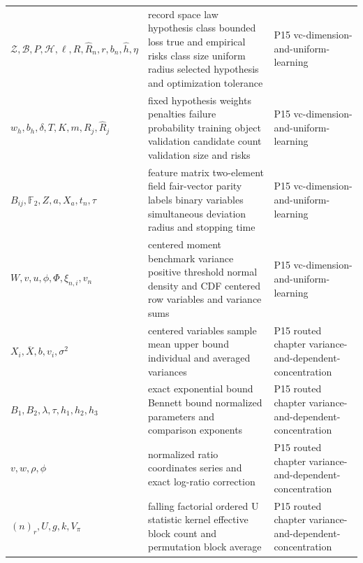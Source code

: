 \begin{longtable}{@{}p{}p{}p{}@{}}
\(\mathcal Z,\allowbreak \mathcal B,\allowbreak P,\allowbreak \mathcal H,\allowbreak \ell,\allowbreak R,\allowbreak \widehat R_n,\allowbreak r,\allowbreak b_n,\allowbreak \widehat h,\allowbreak \eta\) & record space law hypothesis class bounded loss true and empirical risks class size uniform radius selected hypothesis and optimization tolerance & P15 vc-\allowbreak{}dimension-\allowbreak{}and-\allowbreak{}uniform-\allowbreak{}learning \\
\(w_h,\allowbreak b_h,\allowbreak \delta,\allowbreak T,\allowbreak K,\allowbreak m,\allowbreak R_j,\allowbreak \widehat R_j\) & fixed hypothesis weights penalties failure probability training object validation candidate count validation size and risks & P15 vc-\allowbreak{}dimension-\allowbreak{}and-\allowbreak{}uniform-\allowbreak{}learning \\
\(B_{ij},\allowbreak \mathbb F_2,\allowbreak Z,\allowbreak a,\allowbreak X_a,\allowbreak t_n,\allowbreak \tau\) & feature matrix two-element field fair-vector parity labels binary variables simultaneous deviation radius and stopping time & P15 vc-\allowbreak{}dimension-\allowbreak{}and-\allowbreak{}uniform-\allowbreak{}learning \\
\(W,\allowbreak v,\allowbreak u,\allowbreak \phi,\allowbreak \Phi,\allowbreak \xi_{n,i},\allowbreak v_n\) & centered moment benchmark variance positive threshold normal density and CDF centered row variables and variance sums & P15 vc-\allowbreak{}dimension-\allowbreak{}and-\allowbreak{}uniform-\allowbreak{}learning \\
\(X_i,\allowbreak \overline X,\allowbreak b,\allowbreak v_i,\allowbreak \sigma^2\) & centered variables sample mean upper bound individual and averaged variances & P15 routed chapter variance-\allowbreak{}and-\allowbreak{}dependent-\allowbreak{}concentration \\
\(B_1,\allowbreak B_2,\allowbreak \lambda,\allowbreak \tau,\allowbreak h_1,\allowbreak h_2,\allowbreak h_3\) & exact exponential bound Bennett bound normalized parameters and comparison exponents & P15 routed chapter variance-\allowbreak{}and-\allowbreak{}dependent-\allowbreak{}concentration \\
\(v,\allowbreak w,\allowbreak \rho,\allowbreak \phi\) & normalized ratio coordinates series and exact log-ratio correction & P15 routed chapter variance-\allowbreak{}and-\allowbreak{}dependent-\allowbreak{}concentration \\
\((n)_r,\allowbreak U,\allowbreak g,\allowbreak k,\allowbreak V_\pi\) & falling factorial ordered U statistic kernel effective block count and permutation block average & P15 routed chapter variance-\allowbreak{}and-\allowbreak{}dependent-\allowbreak{}concentration \\

\end{longtable}
